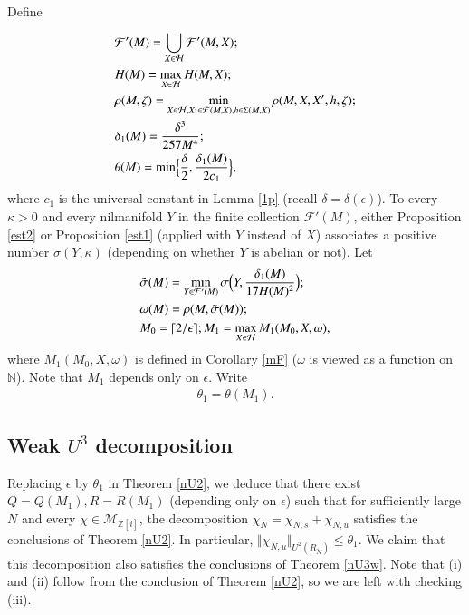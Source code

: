 \documentclass[12pt,amstex]{amsart}
\theoremstyle{definition}
\def \Z {\mathbb{Z}[i]}
\def \D {\kappa}
\def \d {\delta}
\def \e {\epsilon}
\def \R {R_{\tilde{N}}}
\begin{document}
\

Define

  \begin{equation}\nonumber
   \begin{split}
     &\mathcal{F}'(M)=\bigcup_{X\in\mathcal{H}}\mathcal{F}'(M,X);
     \\& H(M)=\max_{X\in\mathcal{H}}H(M,X);
     \\& \rho(M,\zeta)=\min_{X\in\mathcal{H},X'\in\mathcal{F}(M,X),h\in\Sigma(M,X)}\rho(M,X,X',h,\zeta);
     \\& \d_{1}(M)=\frac{\d^{3}}{257M^{4}};
     \\& \theta(M)=\min\Bigl\{\frac{\d}{2},\frac{\d_{1}(M)}{2c_{1}}\Bigr\},
   \end{split}
  \end{equation}
where $c_{1}$ is the universal constant in Lemma \ref{1p} (recall $\d=\d(\e)$). To every $\D>0$ and every nilmanifold $Y$ in the finite collection $\mathcal{F}'(M)$, either Proposition \ref{est2} or Proposition \ref{est1} (applied with $Y$ instead of $X$) associates a positive number $\sigma(Y,\D)$ (depending on whether $Y$ is abelian or not). Let
  \begin{equation}\nonumber
   \begin{split}
   &\tilde{\sigma}(M)=\min_{Y\in\mathcal{F}'(M)}\sigma\Bigl(Y,\frac{\d_{1}(M)}{17H(M)^{2}}\Bigr);
   \\& \omega(M)=\rho(M,\tilde{\sigma}(M));
   \\& M_{0}=\lceil 2/\e\rceil;
   M_{1}=\max_{X\in\mathcal{H}}M_{1}(M_{0},X,\omega),
   \end{split}
  \end{equation}
where $M_{1}(M_{0},X,\omega)$ is defined in Corollary \ref{mF} ($\omega$ is viewed as a function on $\mathbb{N}$). Note that $M_{1}$ depends only on $\e$.
Write
  \begin{equation}\nonumber
   \begin{split}
   \theta_{1}=\theta(M_{1}).
   \end{split}
  \end{equation}
\subsection{Weak $U^{3}$ decomposition}
Replacing $\e$ by $\theta_{1}$ in Theorem \ref{nU2}, we deduce that there exist $Q=Q(M_{1}),R=R(M_{1})$ (depending only on $\e$) such that for sufficiently large $N$ and every $\chi\in\mathcal{M}_{\Z}$, the decomposition $\chi_{N}=\chi_{N,s}+\chi_{N,u}$ satisfies the conclusions of Theorem \ref{nU2}. In particular, $\Vert\chi_{N,u}\Vert_{U^{2}(\R)}\leq \theta_{1}$. We claim that this decomposition also satisfies the conclusions of Theorem \ref{nU3w}. Note that (i) and (ii) follow from the conclusion of Theorem \ref{nU2}, so we are left with checking (iii).
\end{document}
